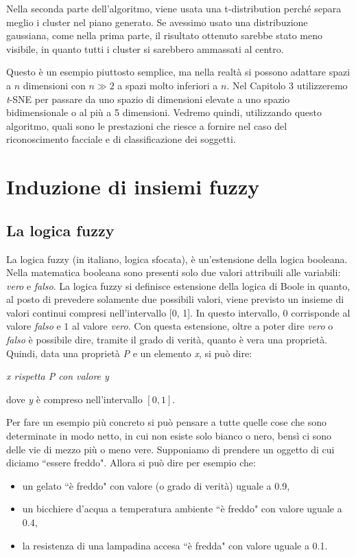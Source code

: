 \documentclass[12pt,italian]{report}
\begin{document}
Nella seconda parte dell'algoritmo, viene usata una t-distribution perché separa meglio i cluster nel piano generato. Se avessimo usato una distribuzione gaussiana, come nella prima parte, il risultato ottenuto sarebbe stato meno visibile, in quanto tutti i cluster si sarebbero ammassati al centro.

Questo è un esempio piuttosto semplice, ma nella realtà si possono adattare spazi a $n$ dimensioni con $ n \gg 2 $ a spazi molto inferiori a $n$. Nel Capitolo 3 utilizzeremo \emph{t}-SNE per passare da uno spazio di dimensioni elevate a uno spazio bidimensionale o al più a 5 dimensioni. Vedremo quindi, utilizzando questo algoritmo, quali sono le prestazioni che riesce a fornire nel caso del riconoscimento facciale e di classificazione dei soggetti.
% 
% 


\chapter{Induzione di insiemi fuzzy}
\label{ch:prova}

\section{La logica fuzzy}
La logica fuzzy (in italiano, logica sfocata), è un'estensione della logica booleana. Nella matematica booleana sono presenti solo due valori attribuili alle variabili: \emph{vero} e \emph{falso}. 
La logica fuzzy si definisce estensione della logica di Boole in quanto, al posto di prevedere solamente due possibili valori, viene previsto un insieme di valori continui compresi nell'intervallo [0, 1]. In questo intervallo, $0$ corrisponde al valore \emph{falso} e $1$ al valore \emph{vero}. Con questa estensione, oltre a poter dire \emph{vero} o \emph{falso} è possibile dire, tramite il grado di verità, quanto è vera una proprietà.
Quindi, data una proprietà \emph{P} e un elemento \emph{x}, si può dire:

\begin{center}
	\centering
	{

		\em{x rispetta P con valore y}
		
	}
\end{center} 
dove \emph{y} è compreso nell'intervallo $ [0,1] $.

Per fare un esempio più concreto si può pensare a tutte quelle cose che sono determinate in modo netto, in cui non esiste solo bianco o nero, bensì ci sono delle vie di mezzo più o meno vere.
Supponiamo di prendere un oggetto di cui diciamo ``essere freddo". Allora si può dire per esempio che:
\begin{itemize}
	\item un gelato ``è freddo" con valore (o grado di verità) uguale a 0.9,
	\item un bicchiere d'acqua a temperatura ambiente ``è freddo" con valore uguale a $ 0.4 $,
	\item la resistenza di una lampadina accesa ``è fredda" con valore uguale a 0.1.
\end{itemize}
\end{document}
